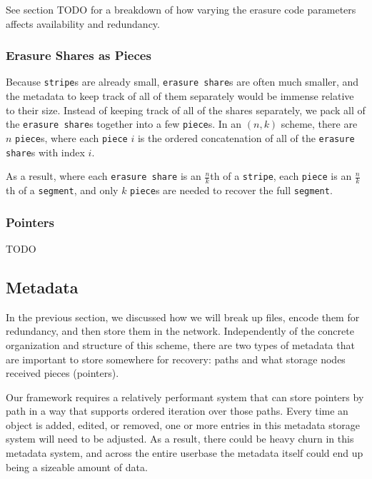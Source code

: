 \documentclass[a4paper,10pt]{article}
\newcommand{\x}[1]{{\tt #1}}
\newcommand{\todo}[1]{{\color{red} TODO #1}}
\begin{document}
See section \todo{} for a breakdown of how varying the erasure code parameters
affects availability and redundancy.

\subsubsection{Erasure Shares as Pieces}

Because \x{stripe}s are already small, \x{erasure share}s are often
much smaller, and the metadata to keep track of all of them separately would be
immense relative to their size. Instead of keeping track of all of the shares
separately, we pack all of the \x{erasure share}s together into a few
\x{piece}s. In an $(n, k)$ scheme, there are $n$ \x{piece}s, where each
\x{piece} $i$ is the ordered concatenation of all of the \x{erasure share}s
with index $i$.

As a result, where each \x{erasure share} is an $\frac{n}{k}$th of a \x{stripe},
each \x{piece} is an $\frac{n}{k}$th of a \x{segment}, and only $k$ \x{piece}s
are needed to recover the full \x{segment}.

\subsubsection{Pointers}

\todo{}

\subsection{Metadata}

In the previous section, we discussed how we will break up files,
encode them for redundancy, and then store them in the network. Independently
of the concrete organization and structure of this scheme, there are two
types of metadata that are important to store somewhere for recovery:
paths and what storage nodes received pieces (pointers).

Our framework requires a relatively performant system that can store
pointers by path in a way that supports ordered iteration over those paths.
Every time an object is added, edited, or removed, one or more entries in this
metadata storage system will need to be adjusted. As a result, there could be
heavy churn in this metadata system, and across the entire
userbase the metadata itself could end up being a sizeable amount of data.
\end{document}
